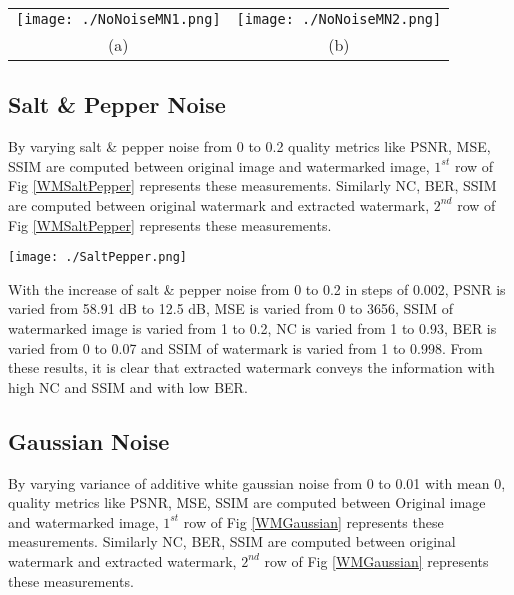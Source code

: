 \begin{figure*}
\begin{tabular}{cc}
\texttt{[image: ./NoNoiseMN1.png]}&\texttt{[image: ./NoNoiseMN2.png]}\\
(a)  & (b) \\

\end{tabular}
\caption{(a) Watermark-1 extraction without noise \\  (b) Watermark-2 extraction without noise }
\label{WMNoNoise}
\end{figure*} 


\subsection{Salt \& Pepper Noise}
	By varying salt \& pepper noise from 0 to 0.2 quality metrics like PSNR, MSE, SSIM are computed between original image and watermarked image, $1^{st}$ row of Fig \ref{WMSaltPepper} represents these measurements. Similarly NC, BER, SSIM are computed between original watermark and extracted watermark, $2^{nd}$ row of Fig \ref{WMSaltPepper} represents these measurements.\\ 
	
\begin{figure*}
\centering
\texttt{[image: ./SaltPepper.png]}
\caption{Salt \& Pepper Noise}
\label{WMSaltPepper}
\end{figure*}

	With the increase of salt \& pepper noise from 0 to 0.2 in steps of 0.002, PSNR is varied from 58.91 dB to 12.5 dB, MSE is varied from 0 to 3656, SSIM of watermarked image is varied from 1 to 0.2, NC is varied from 1 to 0.93, BER is varied from 0 to 0.07 and SSIM of watermark is varied from 1 to 0.998. From these results, it is clear that extracted watermark conveys the information with high NC and SSIM and with low BER.

\subsection{Gaussian Noise}
	By varying variance of additive white gaussian noise from 0 to 0.01 with mean 0, quality metrics like PSNR, MSE, SSIM are computed between Original image and watermarked image, $1^{st}$ row of Fig \ref{WMGaussian} represents these measurements. Similarly NC, BER, SSIM are computed between original watermark and extracted watermark, $2^{nd}$ row of Fig \ref{WMGaussian} represents these measurements. \\

